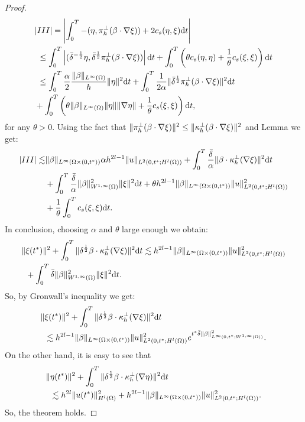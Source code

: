 \begin{proof}
\begin{align*}
&|III| = \left| \displaystyle\int_0^T -(\eta, \pi_{h}^\perp(\beta\cdot \nabla \xi)) + 2c_s(\eta,\xi) {\rm d}t  \right| \\
& \ \leq    \displaystyle\int_0^T \left|  ( \bar \delta^{-\frac{1}{2}}\eta, \bar \delta^{\frac{1}{2}}\pi_{h}^\perp(\beta\cdot \nabla \xi)) \right| {\rm d}t + \displaystyle\int_0^T \left(\theta c_s(\eta,\eta)+\frac{1}{\theta}c_s(\xi,\xi)\right) {\rm d}t\\
& \  \leq \displaystyle\int_0^T \frac{\alpha}{2} \frac{\|\beta\|_{L^\infty(\Omega)}}{h} \|\eta\|^2 {\rm d}t + \displaystyle\int_0^T \frac{1}{2\alpha} \| \bar \delta^{\frac{1}{2}} \pi_{h}^\perp(\beta \cdot \nabla \xi)\|^2 {\rm d}t \\
& +\displaystyle\int_0^T \left(\theta \|\beta\|_{L^\infty(\Omega)}\|\eta\|\|\nabla \eta\| + \frac{1}{\theta}c_s(\xi,\xi)\right) {\rm d}t,
\end{align*}
for any $\theta > 0$. Using the fact that  $\|\pi_{h}^\perp(\beta \cdot \nabla \xi)\|^2 \leq \|\kappa_h^\perp(\beta \cdot \nabla \xi)\|^2$ and Lemma  we get:
\begin{align*}
|III| \lesssim & %
\|\beta\|_{L^\infty(\Qq)} \alpha h^{2l-1} \|u\|_{L^2(0,t^*;H^l(\Omega))} 
+ \tint{\frac{\bar \delta}{\alpha} \| \bb \cdot \szpp (\nabla  \xi) \|^2 }\\
& + \tint{ \frac{\bar \delta}{\alpha}  {\|\bb\|_{W^{1,\infty}(\Omega)}^2}  \|\xi\|^2} + \theta h^{2l-1} \|\bb\|_{L^\infty(\Qq)}  \|u\|^2_{L^2(0,t^*;H^l(\Omega))}\\
& + \frac{1}{\theta} \tint{c_s(\xi,\xi)}  .
\end{align*}
In conclusion, choosing $\alpha$ and $\theta$ large enough we obtain:
\begin{align*}
\|&\xi(t^*)\|^2 + \displaystyle\int_0^T \| \delta^\frac{1}{2} \beta \cdot \kappa_h^\perp (\nabla \xi) \|^2  {\rm d}t  \lesssim  h^{2l-1}\|\beta\|_{L^\infty(\Omega \times (0,t^*))} \|u\|_{L^2(0,t^*;H^l(\Omega))}^2 \\
& +  \displaystyle\int_0^T  \bar \delta \|\beta\|_{W^{1,\infty}(\Omega)}^2 \|\xi\|^2 {\rm d}t.
\end{align*}
So, by Gronwall's inequality we get:
\begin{align*}
\|&\xi(t^*)\|^2 + \displaystyle\int_0^T \| \delta^\frac{1}{2} \beta \cdot \kappa_h^\perp (\nabla \xi) \|^2  {\rm d}t \\
& \lesssim  h^{2l-1}\|\beta\|_{L^\infty(\Omega \times (0,t^*))} \|u\|_{L^2(0,t^*;H^l(\Omega))}^2 e^{t^* {\bar \delta } \|\beta  \|^2_{L^\infty(0,t^*;W^{1,\infty}(\Omega))}}.
\end{align*}
On the other hand, it is easy to see that 
\begin{align*}
\|&\eta(t^*)\|^2 + \displaystyle\int_0^T \| \delta^\frac{1}{2} \beta \cdot \kappa_h^\perp (\nabla \eta) \|^2  {\rm d}t \\
& \lesssim h^{2l} \|u(t^*)\|_{H^l(\Omega)}^2 + h^{2l-1}\|\beta\|_{L^\infty(\Omega \times (0,t^*))} \|u\|^2_{L^2(0,t^*;H^l(\Omega))}.
\end{align*}
So, the theorem holds.
\end{proof}

